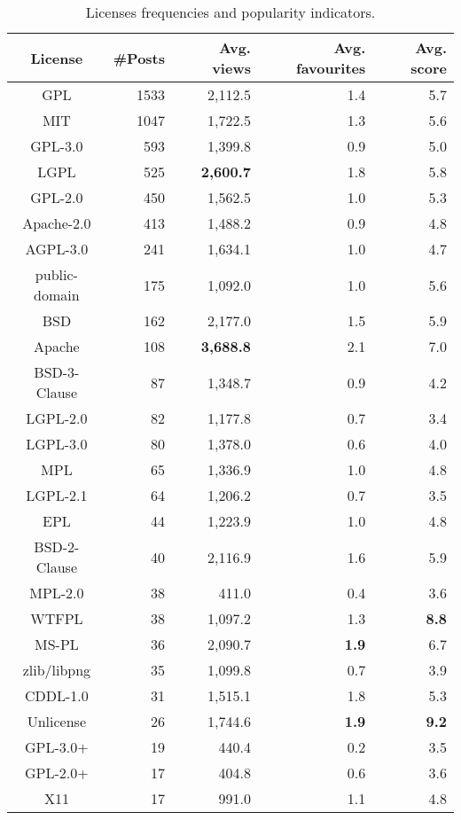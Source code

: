 \documentclass{elsarticle}
\begin{document}
\begin{table}
  \caption{Licenses frequencies and popularity indicators.}
  \label{tab:licenses-popularity}
  \centering
  \begin{adjustbox}{width=0.8\textwidth}
  \begin{tabular}{crrrr}
    \hline
     \textbf{License} & \textbf{\#Posts} &\textbf{Avg. views} &\textbf{Avg. favourites}  & \textbf{Avg. score}\\
     \hline
GPL	&1533 & 2,112.5  &  1.4  & 5.7\\
MIT	&1047 & 1,722.5  &  1.3  & 5.6\\
GPL-3.0	&593 &1,399.8  &  0.9 & 5.0\\
LGPL	&525 & \textbf{2,600.7}  &  1.8 & 5.8\\
GPL-2.0	&450 & 1,562.5& 1.0 & 5.3\\
Apache-2.0	&413 & 1,488.2  &  0.9 & 4.8\\
AGPL-3.0	&241 & 1,634.1 &    1.0 & 4.7\\
public-domain	&175 & 1,092.0 &    1.0 & 5.6\\
BSD	&162 & 2,177.0 &    1.5 & 5.9\\
Apache	&108 & \textbf{3,688.8}  &  2.1 & 7.0\\
BSD-3-Clause	&87 & 1,348.7    &0.9 & 4.2\\
LGPL-2.0	&82 & 1,177.8 &    0.7 & 3.4\\
LGPL-3.0	&80 & 1,378.0 &    0.6 & 4.0\\
MPL	&65 & 1,336.9& 1.0& 4.8\\
LGPL-2.1	&64 & 1,206.2  &  0.7 & 3.5\\
EPL	&44 &  1,223.9& 1.0 & 4.8\\
BSD-2-Clause &40 & 2,116.9 &    1.6 & 5.9\\
MPL-2.0	&38 & 411.0 &  0.4 & 3.6\\
WTFPL	&38 & 1,097.2  &  1.3 & \textbf{8.8}\\
MS-PL	&36 & 2,090.7   & \textbf{1.9} & 6.7\\
zlib/libpng	&35 & 1,099.8  &  0.7 & 3.9\\
CDDL-1.0	&31 & 1,515.1  &  1.8 & 5.3\\
Unlicense	&26 & 1,744.6  &  \textbf{1.9} & \textbf{9.2}\\
GPL-3.0+	&19 & 440.4 &  0.2 & 3.5\\
GPL-2.0+	&17 & 404.8 &  0.6 & 3.6\\
X11	&17 &  991.0  &  1.1 & 4.8\\
  \hline
\end{tabular}
\end{adjustbox}
\end{table}
\end{document}
